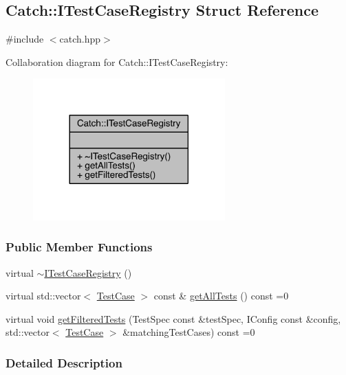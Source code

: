 \hypertarget{a00046}{}\subsection{Catch\+:\+:I\+Test\+Case\+Registry Struct Reference}
\label{a00046}


{\ttfamily \#include $<$catch.\+hpp$>$}



Collaboration diagram for Catch\+:\+:I\+Test\+Case\+Registry\+:\nopagebreak
\begin{figure}[H]
\begin{center}
\leavevmode
\includegraphics[width=209pt]{a00226}
\end{center}
\end{figure}
\subsubsection*{Public Member Functions}
\begin{DoxyCompactItemize}
\item 
virtual \hyperlink{a00046_ae14798f05ac8e2b18cff532849a4da81}{$\sim$\+I\+Test\+Case\+Registry} ()
\item 
virtual std\+::vector$<$ \hyperlink{a00085}{Test\+Case} $>$ const \& \hyperlink{a00046_ad6e4d4a621655123f73ae98cfeda063d}{get\+All\+Tests} () const =0
\item 
virtual void \hyperlink{a00046_a625038a4f698f057503782016cbd0664}{get\+Filtered\+Tests} (Test\+Spec const \&test\+Spec, I\+Config const \&config, std\+::vector$<$ \hyperlink{a00085}{Test\+Case} $>$ \&matching\+Test\+Cases) const =0
\end{DoxyCompactItemize}


\subsubsection{Detailed Description}


